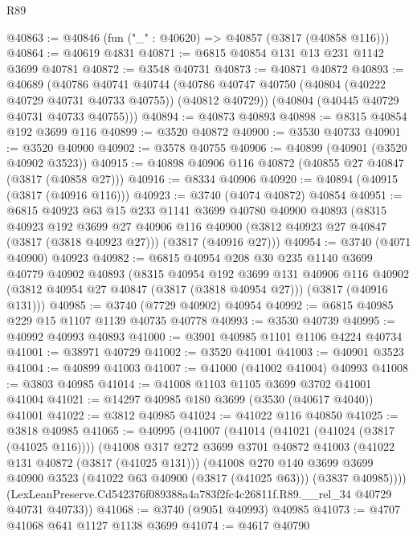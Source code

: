 \begin{lexlean}{R89}
\begin{coremodule}
@40863 := @40846 (fun ("_" : @40620) => @40857 (@3817 (@40858 @116)))
@40864 := @40619 @4831
@40871 := @6815 @40854 @131 @13 @231 @1142 @3699 @40781
@40872 := @3548 @40731
@40873 := @40871 @40872
@40893 := @40689
    (@40786
      @40741
      @40744
      (@40786 @40747 @40750 (@40804 (@40222 @40729 @40731 @40733 @40755)) (@40812 @40729))
      (@40804 (@40445 @40729 @40731 @40733 @40755)))
@40894 := @40873 @40893
@40898 := @8315 @40854 @192 @3699 @116
@40899 := @3520 @40872
@40900 := @3530 @40733
@40901 := @3520 @40900
@40902 := @3578 @40755
@40906 := @40899 (@40901 (@3520 @40902 @3523))
@40915 := @40898 @40906 @116 @40872 (@40855 @27 @40847 (@3817 (@40858 @27)))
@40916 := @8334 @40906
@40920 := @40894 (@40915 (@3817 (@40916 @116)))
@40923 := @3740 (@4074 @40872) @40854
@40951 := @6815
    @40923
    @63
    @15
    @233
    @1141
    @3699
    @40780
    @40900
    @40893
    (@8315
      @40923
      @192
      @3699
      @27
      @40906
      @116
      @40900
      (@3812 @40923 @27 @40847 (@3817 (@3818 @40923 @27)))
      (@3817 (@40916 @27)))
@40954 := @3740 (@4071 @40900) @40923
@40982 := @6815
    @40954
    @208
    @30
    @235
    @1140
    @3699
    @40779
    @40902
    @40893
    (@8315
      @40954
      @192
      @3699
      @131
      @40906
      @116
      @40902
      (@3812 @40954 @27 @40847 (@3817 (@3818 @40954 @27)))
      (@3817 (@40916 @131)))
@40985 := @3740 (@7729 @40902) @40954
@40992 := @6815 @40985 @229 @15 @1107 @1139 @40735 @40778
@40993 := @3530 @40739
@40995 := @40992 @40993 @40893
@41000 := @3901 @40985 @1101 @1106 @4224 @40734
@41001 := @38971 @40729
@41002 := @3520 @41001
@41003 := @40901 @3523
@41004 := @40899 @41003
@41007 := @41000 (@41002 @41004) @40993
@41008 := @3803 @40985
@41014 := @41008 @1103 @1105 @3699 @3702 @41001 @41004
@41021 := @14297 @40985 @180 @3699 (@3530 (@40617 @4040)) @41001
@41022 := @3812 @40985
@41024 := @41022 @116 @40850
@41025 := @3818 @40985
@41065 := @40995
    (@41007
      (@41014
        (@41021 (@41024 (@3817 (@41025 @116))))
        (@41008
          @317
          @272
          @3699
          @3701
          @40872
          @41003
          (@41022 @131 @40872 (@3817 (@41025 @131)))
          (@41008
            @270
            @140
            @3699
            @3699
            @40900
            @3523
            (@41022 @63 @40900 (@3817 (@41025 @63)))
            (@3837 @40985))))
      (LexLeanPreserve.Cd542376f089388a4a783f2fc4c26811f.R89.__rel_34 @40729 @40731 @40733))
@41068 := @3740 (@9051 @40993) @40985
@41073 := @4707 @41068 @641 @1127 @1138 @3699
@41074 := @4617 @40790

\end{coremodule}
\end{lexlean}
